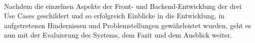 \pagebreak 
\\ 
\linebreak
Nachdem die einzelnen Aspekte der Front- und Backend-Entwicklung der drei Use Cases geschildert und so erfolgreich Einblicke in die Entwicklung, in 
aufgetretenen Hindernissen und Problemstellungen gewährleistet wurden, geht es nun mit der Evaluierung des Systems, dem Fazit und dem Ausblick weiter.

